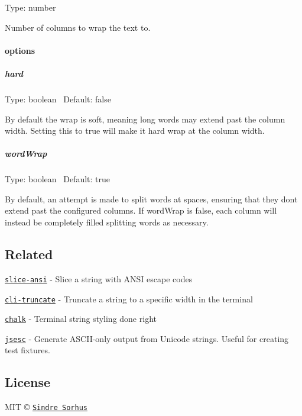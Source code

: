 Type\+: {\ttfamily number}

Number of columns to wrap the text to.

\paragraph*{options}

\subparagraph*{hard}

Type\+: {\ttfamily boolean}~\newline
 Default\+: {\ttfamily false}

By default the wrap is soft, meaning long words may extend past the column width. Setting this to {\ttfamily true} will make it hard wrap at the column width.

\subparagraph*{word\+Wrap}

Type\+: {\ttfamily boolean}~\newline
 Default\+: {\ttfamily true}

By default, an attempt is made to split words at spaces, ensuring that they don\textquotesingle{}t extend past the configured columns. If word\+Wrap is {\ttfamily false}, each column will instead be completely filled splitting words as necessary.

\subsection*{Related}


\begin{DoxyItemize}
\item \href{https://github.com/chalk/slice-ansi}{\tt slice-\/ansi} -\/ Slice a string with A\+N\+SI escape codes
\item \href{https://github.com/sindresorhus/cli-truncate}{\tt cli-\/truncate} -\/ Truncate a string to a specific width in the terminal
\item \href{https://github.com/chalk/chalk}{\tt chalk} -\/ Terminal string styling done right
\item \href{https://github.com/mathiasbynens/jsesc}{\tt jsesc} -\/ Generate A\+S\+C\+I\+I-\/only output from Unicode strings. Useful for creating test fixtures.
\end{DoxyItemize}

\subsection*{License}

M\+IT © \href{https://sindresorhus.com}{\tt Sindre Sorhus} 